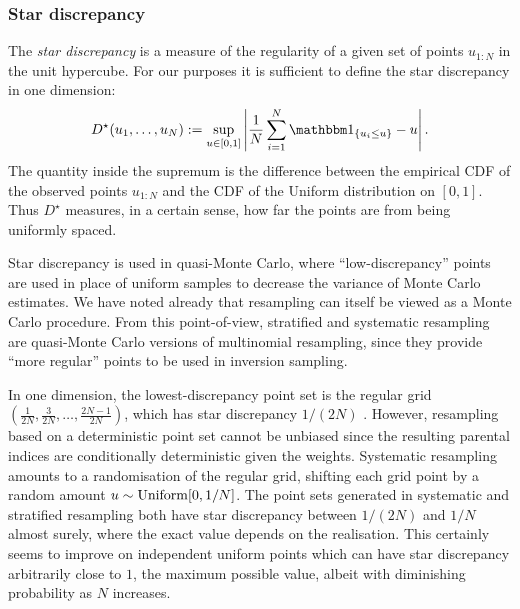 \subsubsection{Star discrepancy \seb{$\checkmark$} }

The \emph{star discrepancy}\seb{[citation]} is a measure of the regularity of a given set of points $u_{1:N}$ in the unit hypercube. For our purposes it is sufficient to define the star discrepancy in one dimension:
\begin{equation*}
D^\star (u_1, \dots, u_N) := \sup_{u \in [0,1]} \left| \frac{1}{N} \sum_{i=1}^N \I{u_i \leq u} -u \right| .
\end{equation*}
The quantity inside the supremum is the difference between the empirical CDF of the observed points $u_{1:N}$ and the CDF of the Uniform distribution on $[0,1]$.
Thus $D^\star$ measures, in a certain sense, how far the points are from being uniformly spaced.

Star discrepancy is used in quasi-Monte Carlo, where ``low-discrepancy'' points are used in place of uniform samples to decrease the variance of Monte Carlo estimates.
We have noted already  that resampling can itself be viewed as a Monte Carlo procedure.
From this point-of-view, stratified and systematic resampling are quasi-Monte Carlo versions of multinomial resampling, since they provide ``more regular'' points to be used in inversion sampling.

In one dimension, the lowest-discrepancy point set is the regular grid $( \frac{1}{2N}, \frac{3}{2N}, \dots, \frac{2N-1}{2N} )$, which has star discrepancy $1/(2N)$ \seb{[citation]}.
However, resampling based on a deterministic point set cannot be unbiased since the resulting parental indices are conditionally deterministic given the weights.
Systematic resampling amounts to a randomisation of the regular grid, shifting each grid point by a random amount $u \sim \operatorname{Uniform}[0,1/N]$.
The point sets generated in systematic and stratified resampling both have star discrepancy between $1/(2N)$ and $1/N$ almost surely, where the exact value depends on the realisation.
This certainly seems to improve on independent uniform points which can have star discrepancy arbitrarily close to $1$, the maximum possible value, albeit with diminishing probability as $N$ increases.




